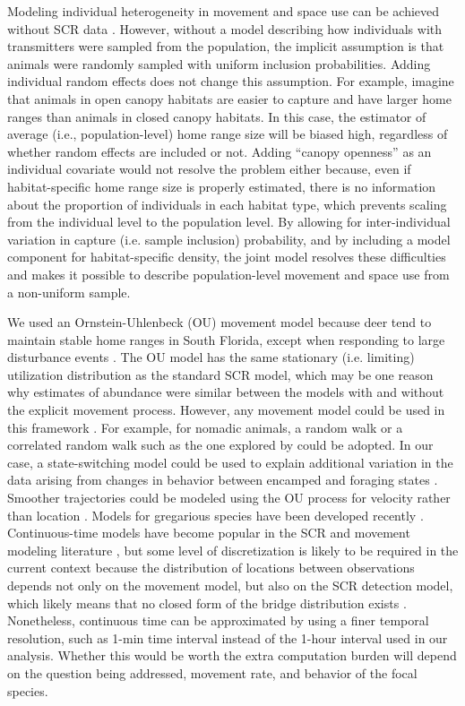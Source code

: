\documentclass[12pt]{article}
\begin{document}
Modeling individual heterogeneity in movement and space use can be
achieved without SCR data
\citep{hanks_etal:2011,hooten_etal:2016,jonsen:2016}. 
However, without a model describing how individuals with transmitters
were sampled from the population, the implicit assumption is that
animals were randomly sampled with uniform inclusion probabilities. 
Adding individual random effects does not change this assumption. For
example, imagine that animals in open canopy habitats are easier to
capture and have larger home ranges than animals in closed canopy
habitats. In this case, the estimator of average (i.e.,
population-level) home range size will be biased high, regardless of
whether random effects are included or not. Adding ``canopy openness'' as an
individual covariate would not resolve the problem either because, even
if habitat-specific home range size is properly estimated, there is no
information about the proportion of individuals in each habitat type,
which prevents scaling from the individual level to the population  
level. By allowing for inter-individual variation in capture
(i.e. sample inclusion) probability, and by including a model
component for habitat-specific density, the joint
model resolves these difficulties and makes it possible to describe
population-level movement and space use from a non-uniform sample. 

We used an Ornstein-Uhlenbeck (OU) movement model because deer tend to
maintain stable home ranges in South Florida, except when responding
to large disturbance events \citep{cherry_etal:2018,abernathy_etal:2019}. 
The OU model has the same stationary (i.e. limiting) utilization
distribution as the standard SCR model, which may be one reason why
estimates of abundance were similar between the models with and
without the explicit movement process. However, any movement model
could be used in this framework \citep{mcclintock_etal:2021}. For
example, for nomadic animals, a random walk or a correlated random
walk such as the one explored by \citet{royle_etal:2016} could be
adopted. In our case, a state-switching model could be used to explain
additional variation in the data arising from changes in behavior
between encamped and foraging states
\citep{mcclintock_etal:2012,michelot_blackwell:2019}. Smoother
trajectories could be modeled using the OU process for velocity rather
than location \citep{hanks_etal:2011}. Models for gregarious species
have been developed recently \citep{langrock_etal:2014}. Continuous-time
models have become popular in the SCR and movement modeling
literature \citep{harris_blackwell:2013,borchers_etal:2014}, but
some level of discretization is likely to be required 
in the current context because the distribution of locations between
observations depends not only on the movement model, but also on the
SCR detection model, which likely means that no closed form of the
bridge distribution exists \citep{glennie_etal:2020}. Nonetheless,
continuous time can be approximated by using a finer temporal
resolution, such as 1-min time interval instead of the 1-hour
interval used in our analysis. Whether this would be worth the extra
computation burden will depend on the question being addressed,
movement rate, and behavior of the focal species. 
\end{document}

